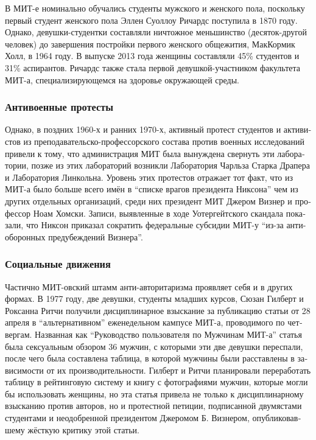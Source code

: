 \begin{russian}
В МИТ-е номинально обучались студенты мужского и женского пола, поскольку первый студент женского пола Эллен Суоллоу Ричардс поступила в 1870 году. Однако, девушки-студентки составляли ничтожное меньшинство (десяток-другой человек) до завершения постройки первого женского общежития, МакКормик Холл, в 1964 году. В выпуске 2013 года женщины составляли 45\% студентов и 31\% аспирантов. Ричардс также стала первой девушкой-участником факультета МИТ-а, специализирующемся на здоровье окружающей среды.

\subsubsection {Антивоенные протесты}

Однако, в поздних 1960-х и ранних 1970-х, активный протест студентов и активистов из преподавательско-профессорского состава против военных исследований привели к тому, что администрация МИТ была вынуждена свернуть эти лаборатории, позже из этих лабораторий возникли Лаборатория Чарльза Старка Драпера и Лаборатория Линкольна. Уровень этих протестов отражает тот факт, что из МИТ-а было больше всего имён в ``списке врагов президента Никсона'' чем из других отдельных организаций, среди них президент МИТ Джером Визнер и профессор Ноам Хомски. Записи, выявленные в ходе Уотергейтского скандала показали, что Никсон приказал сократить федеральные субсидии МИТ-у ``из-за анти-оборонных предубеждений Визнера''.

\subsubsection {Социальные движения}

Частично МИТ-овский штамм анти-авторитаризма проявляет себя и в других формах. В 1977 году, две девушки, студенты младших курсов, Сюзан Гилберт и Роксанна Ритчи получили дисциплинарное взыскание за публикацию статьи от 28 апреля в ``альтернативном'' еженедельном кампусе МИТ-а, проводимого по четвергам. Названная как ``Руководство пользователя по Мужчинам МИТ-а'' статья была сексуальным обзором 36 мужчин, с которыми эти две девушки переспали, после чего была составлена таблица, в которой мужчины были расставлены в зависимости от их производительности. Гилберт и Ритчи планировали переработать таблицу в рейтинговую систему и книгу с фотографиями мужчин, которые могли бы использовать женщины, но эта статья привела не только к дисциплинарному взысканию против авторов, но и протестной петиции, подписанной двумястами студентами и неодобренной президентом Джеромом Б. Визнером, опубликовавшему жёсткую критику этой статьи.
\end{russian}
